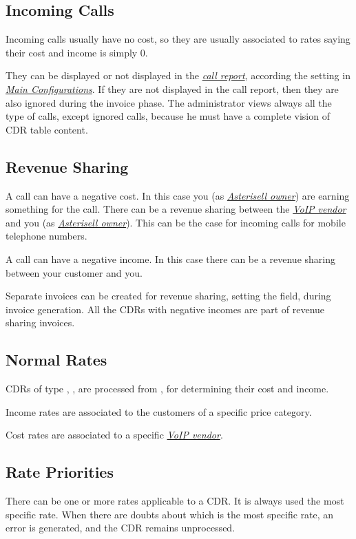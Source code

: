 \documentclass[letterpaper,10pt,english]{sphinxmanual}
\begin{document}
\subsection{Incoming Calls}
\label{index:incoming-calls}
Incoming calls usually have no cost, so they are usually associated to rates saying their cost and income is simply 0.

They can be displayed or not displayed in the {\hyperref[index:term-call-report]{\emph{call report}}}, according the setting  in {\hyperref[index:main-configurations]{\emph{Main Configurations}}}. If they are not displayed in the call report, then they are also ignored during the invoice phase. The administrator views always all the type of calls, except ignored calls, because he must have a complete vision of CDR table content.


\subsection{Revenue Sharing}
\label{index:revenue-sharing}
A call can have a negative cost. In this case you (as {\hyperref[index:term-asterisell-owner]{\emph{Asterisell owner}}}) are earning something for the call. There can be a revenue sharing between the {\hyperref[index:term-voip-vendor]{\emph{VoIP vendor}}} and you (as {\hyperref[index:term-asterisell-owner]{\emph{Asterisell owner}}}). This can be the case for incoming calls for mobile telephone numbers.

A call can have a negative income. In this case there can be a revenue sharing between your customer and you.

Separate invoices can be created for revenue sharing, setting the  field, during invoice generation. All the CDRs with negative incomes are part of revenue sharing invoices.


\subsection{Normal Rates}
\label{index:normal-rates}
CDRs of type , ,  are processed from , for determining their cost and income.

Income rates are associated to the customers of a specific price category.

Cost rates are associated to a specific {\hyperref[index:term-voip-vendor]{\emph{VoIP vendor}}}.


\subsection{Rate Priorities}
\label{index:rate-priorities}
There can be one or more rates applicable to a CDR. It is always used the most specific rate. When there are doubts about which is the most specific rate, an error is generated, and the CDR remains unprocessed.
\end{document}
